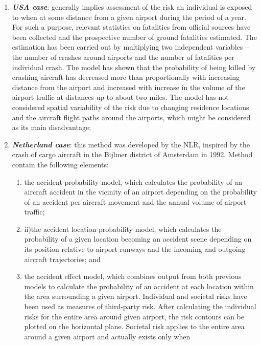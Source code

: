 \documentclass[a4paper, 10pt]{article}
\begin{document}
\begin{enumerate}
		\item \textit{\textbf{USA case}}:  generally implies assessment of the risk
				an individual is exposed to when at some distance from a given
				airport during the period of a year. For such a purpose, relevant
				statistics on fatalities from official sources have been collected
				and the prospective number of ground fatalities estimated. The
				estimation has been carried out by multiplying two independent
				variables – the number of crashes around airports and the
				number of fatalities per individual crash. The model has shown
				that the probability of being killed by crashing aircraft has
				decreased more than proportionally with increasing distance
				from the airport and increased with increase in the volume of
				the airport traffic at distances up to about two miles. The model
				has not considered spatial variability of the risk due to
				changing residence locations and the aircraft flight paths
				around the airports, which might be considered as its main
				disadvantage;
		\item \textit{\textbf{Netherland case}}: this method was developed by
				the NLR, inspired by the crash of cargo aircraft in the Bijlmer
				district of Amsterdam in 1992. Method contain the following
				elements:
				\begin{enumerate}
						\item the accident probability model, which
				calculates the probability of an aircraft accident in the vicinity
				of an airport depending on the probability of an accident per
				aircraft movement and the annual volume of airport traffic; 
						\item ii)the accident location probability model, which calculates the
				probability of a given location becoming an accident scene
				depending on its position relative to airport runways and the
				incoming and outgoing aircraft trajectories; and 
						\item the
				accident effect model, which combines output from both
				previous models to calculate the probability of an accident at
				each location within the area surrounding a given airport.
				Individual and societal risks have been used as measures of
				third-party risk. After calculating the individual risks for the
				entire area around given airport, the risk contours can be
				plotted on the horizontal plane. Societal risk applies to the
				entire area around a given airport and actually exists only when

\end{enumerate}
\end{enumerate}
\end{document}
